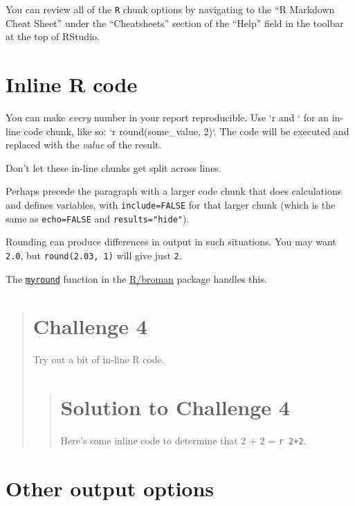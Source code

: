 \documentclass[]{book}
\begin{document}
You can review all of the \texttt{R} chunk options by navigating to the
``R Markdown Cheat Sheet'' under the ``Cheatsheets'' section of the
``Help'' field in the toolbar at the top of RStudio.

\section{Inline R code}\label{inline-r-code}

You can make \emph{every} number in your report reproducible. Use `r and
` for an in-line code chunk, like so: `r round(some\_value, 2)`. The
code will be executed and replaced with the \emph{value} of the result.

Don't let these in-line chunks get split across lines.

Perhaps precede the paragraph with a larger code chunk that does
calculations and defines variables, with \texttt{include=FALSE} for that
larger chunk (which is the same as \texttt{echo=FALSE} and
\texttt{results="hide"}).

Rounding can produce differences in output in such situations. You may
want \texttt{2.0}, but \texttt{round(2.03,\ 1)} will give just
\texttt{2}.

The
\href{https://github.com/kbroman/broman/blob/master/R/myround.R}{\texttt{myround}}
function in the \href{https://github.com/kbroman/broman}{R/broman}
package handles this.

\begin{quote}
\section{Challenge 4}\label{challenge-4}

Try out a bit of in-line R code.

\begin{quote}
\section{Solution to Challenge 4}\label{solution-to-challenge-4}

Here's some inline code to determine that 2 + 2 =
\texttt{\textasciigrave{}r\ 2+2\textasciigrave{}}.
\end{quote}
\end{quote}

\section{Other output options}\label{other-output-options}
\end{document}
